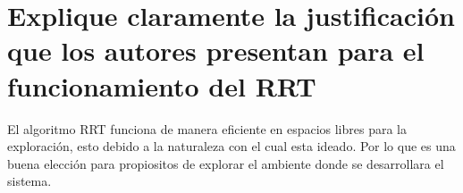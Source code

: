\section{Explique claramente la justificación que los autores presentan para el funcionamiento del RRT}
El algoritmo RRT funciona de manera eficiente en espacios libres para la exploración, esto debido a la naturaleza con el cual esta ideado. Por lo que es una buena elección para propiositos de explorar el ambiente donde se desarrollara el sistema.
